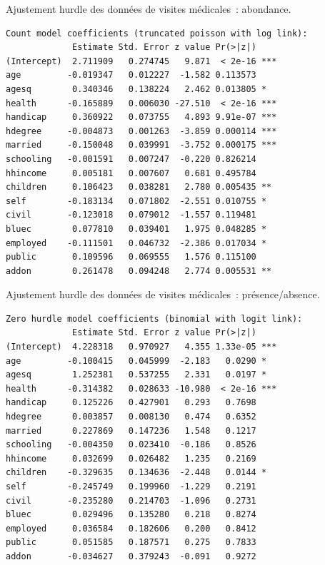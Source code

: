 \documentclass{BeamerTemplate}
\begin{document}
\begin{refsection}
\begin{frame}[fragile]{Ajustement hurdle des données de visites médicales~: abondance.}

{\scriptsize
\begin{verbatim}
Count model coefficients (truncated poisson with log link):
             Estimate Std. Error z value Pr(>|z|)    
(Intercept)  2.711909   0.274745   9.871  < 2e-16 ***
age         -0.019347   0.012227  -1.582 0.113573    
agesq        0.340346   0.138224   2.462 0.013805 *  
health      -0.165889   0.006030 -27.510  < 2e-16 ***
handicap     0.360922   0.073755   4.893 9.91e-07 ***
hdegree     -0.004873   0.001263  -3.859 0.000114 ***
married     -0.150048   0.039991  -3.752 0.000175 ***
schooling   -0.001591   0.007247  -0.220 0.826214    
hhincome     0.005181   0.007607   0.681 0.495784    
children     0.106423   0.038281   2.780 0.005435 ** 
self        -0.183134   0.071802  -2.551 0.010755 *  
civil       -0.123018   0.079012  -1.557 0.119481    
bluec        0.077810   0.039401   1.975 0.048285 *  
employed    -0.111501   0.046732  -2.386 0.017034 *  
public       0.109596   0.069555   1.576 0.115100    
addon        0.261478   0.094248   2.774 0.005531 ** 
\end{verbatim}
}

\end{frame}


\begin{frame}[fragile]{Ajustement hurdle des données de visites médicales~: présence/absence.}

{\scriptsize
\begin{verbatim}
Zero hurdle model coefficients (binomial with logit link):
             Estimate Std. Error z value Pr(>|z|)    
(Intercept)  4.228318   0.970927   4.355 1.33e-05 ***
age         -0.100415   0.045999  -2.183   0.0290 *  
agesq        1.252381   0.537255   2.331   0.0197 *  
health      -0.314382   0.028633 -10.980  < 2e-16 ***
handicap     0.125226   0.427901   0.293   0.7698    
hdegree      0.003857   0.008130   0.474   0.6352    
married      0.227869   0.147236   1.548   0.1217    
schooling   -0.004350   0.023410  -0.186   0.8526    
hhincome     0.032699   0.026482   1.235   0.2169    
children    -0.329635   0.134636  -2.448   0.0144 *  
self        -0.245749   0.199960  -1.229   0.2191    
civil       -0.235280   0.214703  -1.096   0.2731    
bluec        0.029496   0.135280   0.218   0.8274    
employed     0.036584   0.182606   0.200   0.8412    
public       0.051585   0.187571   0.275   0.7833    
addon       -0.034627   0.379243  -0.091   0.9272    
\end{verbatim}
}


\end{frame}
\end{refsection}
\end{document}
